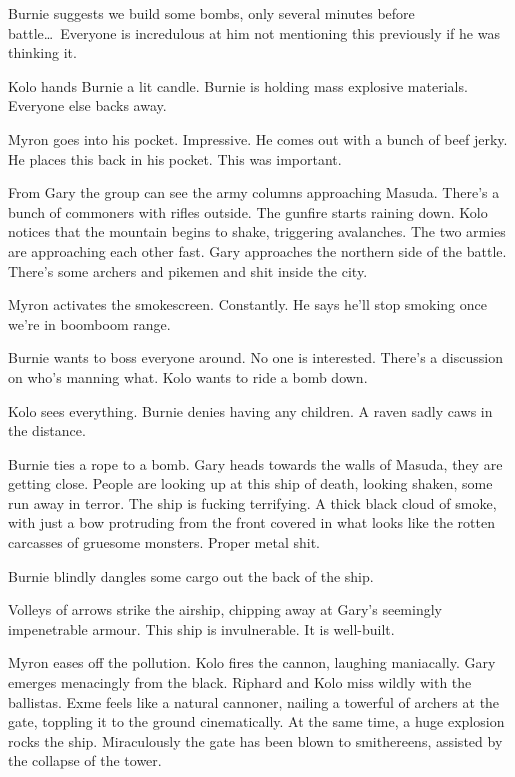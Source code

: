 Burnie suggests we build some bombs, only several minutes before battle\ldots\ Everyone is incredulous at him not mentioning this previously if he was thinking it.\medskip

Kolo hands Burnie a lit candle. Burnie is holding mass explosive materials. Everyone else backs away.\medskip

Myron goes into his pocket. Impressive. He comes out with a bunch of beef jerky. He places this back in his pocket. This was important.\medskip

From Gary the group can see the army columns approaching Masuda. There's a bunch of commoners with rifles outside. The gunfire starts raining down. Kolo notices that the mountain begins to shake, triggering avalanches. The two armies are approaching each other fast. Gary approaches the northern side of the battle. There's some archers and pikemen and shit inside the city.\medskip

Myron activates the smokescreen. Constantly. He says he'll stop smoking once we're in boomboom range.\medskip

Burnie wants to boss everyone around. No one is interested. There's a discussion on who's manning what. Kolo wants to ride a bomb down.\medskip

Kolo sees everything. Burnie denies having any children. A raven sadly caws in the distance.\medskip

Burnie ties a rope to a bomb. Gary heads towards the walls of Masuda, they are getting close. People are looking up at this ship of death, looking shaken, some run away in terror. The ship is fucking terrifying. A thick black cloud of smoke, with just a bow protruding from the front covered in what looks like the rotten carcasses of gruesome monsters. Proper metal shit.\medskip

Burnie blindly dangles some cargo out the back of the ship.\medskip

Volleys of arrows strike the airship, chipping away at Gary's seemingly impenetrable armour. This ship is invulnerable. It is well-built.\medskip

Myron eases off the pollution. Kolo fires the cannon, laughing maniacally. Gary emerges menacingly from the black. Riphard and Kolo miss wildly with the ballistas. Exme feels like a natural cannoner, nailing a towerful of archers at the gate, toppling it to the ground cinematically. At the same time, a huge explosion rocks the ship. Miraculously the gate has been blown to smithereens, assisted by the collapse of the tower.\medskip

